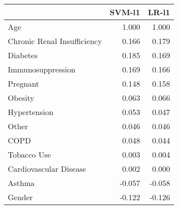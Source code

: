 \begin{tabular}{lrr}
\toprule
{} &  SVM-l1 &  LR-l1 \\
\midrule
Age                         &   1.000 &  1.000 \\
Chronic Renal Insufficiency &   0.166 &  0.179 \\
Diabetes                    &   0.185 &  0.169 \\
Immunosuppression           &   0.169 &  0.166 \\
Pregnant                    &   0.148 &  0.158 \\
Obesity                     &   0.063 &  0.066 \\
Hypertension                &   0.053 &  0.047 \\
Other                       &   0.046 &  0.046 \\
COPD                        &   0.048 &  0.044 \\
Tobacco Use                 &   0.003 &  0.004 \\
Cardiovascular Disease      &   0.002 &  0.000 \\
Asthma                      &  -0.057 & -0.058 \\
Gender                      &  -0.122 & -0.126 \\
\bottomrule
\end{tabular}
